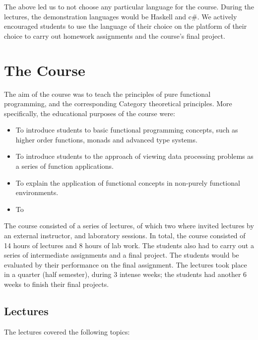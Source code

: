 \documentclass[conference]{IEEEtran}
\begin{document}
The above led us to not choose any particular language for the course. 
During the lectures, the demonstration languages would be Haskell and
{\sc c\#}. We actively encouraged students to use the language of their
choice on the platform of their choice to carry out homework assignments
and the course's final project.

\section{The Course}

The aim of the course was to teach the principles of pure functional
programming, and the corresponding Category theoretical principles. 
More specifically, the educational purposes of the course were:

\begin{itemize}

  \item To introduce students to basic functional programming concepts, such
    as higher order functions, monads and advanced type systems.

  \item To introduce students to the approach of viewing data processing
    problems as a series of function applications.

  \item To explain the application of functional concepts in non-purely
    functional environments.

  \item To 

\end{itemize}

The course consisted of a series of lectures, of which two where invited
lectures by an external instructor, and laboratory sessions. In total, the
course consisted of 14 hours of lectures and 8 hours of lab work.
The students
also had to carry out a series of intermediate assignments and a final project.
The students would be evaluated by their performance on the final assignment. 
The lectures took place in a quarter (half semester), during 3 intense 
weeks; the students had another 6 weeks to finish their final projects.

\subsection{Lectures}

The lectures covered the following topics:
\end{document}
